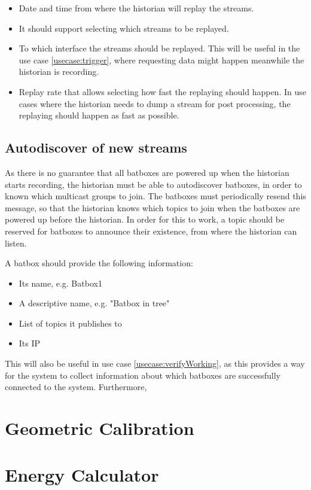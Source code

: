 \begin{itemize}
	\item Date and time from where the historian will replay the streams.
	\item It should support selecting which streams to be replayed.
	\item To which interface the streams should be replayed. This will be useful in the use case \ref{usecase:trigger}, where requesting data might happen meanwhile the historian is recording.
	\item Replay rate that allows selecting how fast the replaying should happen. In use cases where the historian needs to dump a stream for post processing, the replaying should happen as fast as possible.
\end{itemize}

\subsection{Autodiscover of new streams}
As there is no guarantee that all batboxes are powered up when the historian starts recording, the historian must be able to autodiscover batboxes, in order to known which multicast groups to join. The batboxes must periodically resend this message, so that the historian knows which topics to join when the batboxes are powered up before the historian.
 In order for this to work, a topic should be reserved for batboxes to announce their existence, from where the historian can listen. 

A batbox should provide the following information:
\begin{itemize}
	\item Its name, e.g. Batbox1
	\item A descriptive name, e.g. "Batbox in tree"
	\item List of topics it publishes to
	\item Its IP
\end{itemize}
 

This will also be useful in use case \ref{usecase:verifyWorking}, as this provides a way for the system to collect information about which batboxes are successfully connected to the system.
Furthermore, 


\section{Geometric Calibration}


\section{Energy Calculator}

